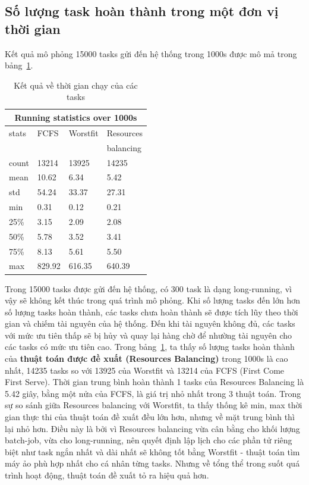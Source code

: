 \documentclass{my_style}
\begin{document}
\subsection{Số lượng task hoàn thành trong một đơn vị thời gian}
Kết quả mô phỏng 15000 tasks gửi đến hệ thống trong 1000s được mô mả trong bảng~\ref{table:finished_tasks}.
\begin{table}[h!]
	\centering
	\caption{Kết quả về thời gian chạy của các tasks}
	\begin{tabular}{|p{1.5cm}| p{1.5cm} | p{1.5cm} | p{1.6cm}|}
		\hline
		\multicolumn{4}{|c|}{Running statistics over 1000s} \\
		\hline
		stats & FCFS & Worstfit & Resources \\
			&	&	& balancing \\
		\hline
		\hline
		count&13214&13925&14235 \\
		\hline
		mean&10.62&6.34&5.42 \\
		\hline
		std&54.24&33.37&27.31 \\
		\hline
		min&0.31&0.12&0.21 \\
		\hline
		25\%&3.15&2.09&2.08 \\
		\hline
		50\%&5.78&3.52&3.41 \\
		\hline
		75\%&8.13&5.61&5.50 \\
		\hline
		max&829.92&616.35&640.39 \\
		\hline
	\end{tabular}
	\label{table:finished_tasks}
\end{table}
Trong 15000 tasks được gửi đến hệ thống, có 300 task là dạng long-running, vì vậy sẽ không kết thúc trong quá trình mô phỏng. Khi số lượng tasks đến lớn hơn số lượng tasks hoàn thành, các tasks chưa hoàn thành sẽ được tích lũy theo thời gian và chiếm tài nguyên của hệ thống. Đến khi tài nguyên không đủ, các tasks với mức ưu tiên thấp sẽ bị hủy và quay lại hàng chờ để nhường tài nguyên cho các tasks có mức ưu tiên cao. Trong bảng~\ref{table:finished_tasks}, ta thấy số lượng tasks hoàn thành của \textbf{thuật toán được đề xuất (Resources Balancing)} trong 1000s là cao nhất, 14235 tasks so với 13925 của Worstfit và 13214 của FCFS (First Come First Serve). Thời gian trung bình hoàn thành 1 tasks của Resources Balancing là 5.42 giây, bằng một nửa của FCFS, là giá trị nhỏ nhất trong 3 thuật toán. Trong sự so sánh giữa Resources balancing với Worstfit, ta thấy thống kê min, max thời gian thực thi của thuật toán đề xuất đều lớn hơn, nhưng về mặt trung bình thì lại nhỏ hơn. Điều này là bởi vì Resources balancing vừa cân bằng cho khối lượng batch-job, vừa cho long-running, nên quyết định lập lịch cho các phần tử riêng biệt như task ngắn nhất và dài nhất sẽ không tốt bằng Worstfit - thuật toán tìm máy ảo phù hợp nhất cho cá nhân từng tasks. Nhưng về tổng thể trong suốt quá trình hoạt động, thuật toán đề xuất tỏ ra hiệu quả hơn. 
\end{document}
